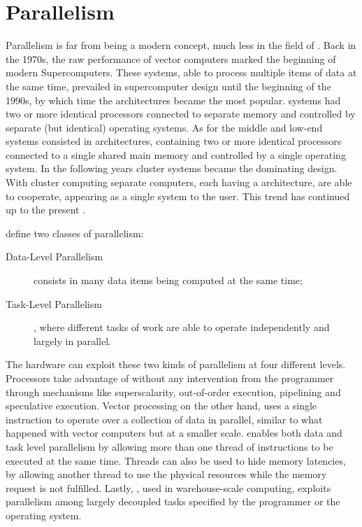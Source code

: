 \documentclass[../thesis]{subfiles}
\begin{document}
		\section{Parallelism}
		Parallelism is far from being a modern concept, much less in the field of \hpc. Back in the 1970s, the raw performance of vector computers marked the beginning of modern Supercomputers\cite{Strohmaier:2005:20years}. These systems, able to process multiple items of data at the same time, prevailed in supercomputer design until the beginning of the 1990s, by which time the \mpp architectures became the most popular. \mpp systems had two or more identical processors connected to separate memory and controlled by separate (but identical) operating systems. As for the middle and low-end systems consisted in \smp architectures, containing two or more identical processors connected to a single shared main memory and controlled by a single operating system. In the following years cluster systems became the dominating design. With cluster computing separate computers, each having a \smp architecture, are able to cooperate, appearing as a single system to the user. This trend has continued up to the present \cite{TheNextWave:1:2013:Supercomputers,TOP500:overtime}.

		 define two classes of parallelism:
			\begin{description}
				\item [Data-Level Parallelism] consists in many data items being computed at the same time;
				\item [Task-Level Parallelism], where different tasks of work are able to operate independently and largely in parallel.
			\end{description}
		The hardware can exploit these two kinds of parallelism at four different levels. Processors take advantage of \ilp without any intervention from the programmer through mechanisms like superscalarity, out-of-order execution, pipelining and speculative execution. Vector processing on the other hand, uses a single instruction to operate over a collection of data in parallel, similar to what happened with vector computers but at a smaller scale. \tlp enables both data and task level parallelism by allowing more than one thread of instructions to be executed at the same time. Threads can also be used to hide memory latencies, by allowing another thread to use the physical resources while the memory request is not fulfilled. Lastly, \rlp, used in warehouse-scale computing, exploits parallelism among largely decoupled tasks specified by the programmer or the operating system.
\end{document}

